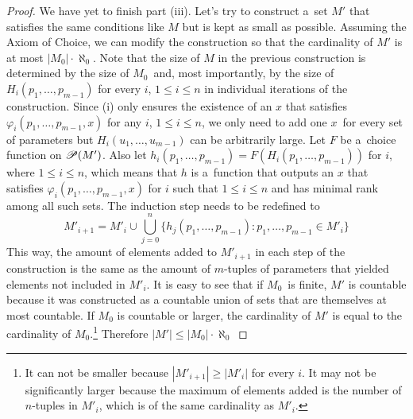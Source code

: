 \begin{proof}
We have yet to finish part (iii).
Let's try to construct a~set $M'$ that satisfies the same conditions like $M$ but is kept as small as possible. Assuming the Axiom of Choice, we can modify the construction so that the cardinality of $M'$ is at most $|M_0| \cdot \aleph_0$. Note that the size of $M$ in the previous construction is determined by the size of $M_0$ and, most importantly, by the size of $H_i(p_1, \ldots, p_{m-1})$ for every $i$, $1 \leq i \leq n$ in individual iterations of the construction. Since (i) only ensures the existence of an $x$ that satisfies $\varphi_i(p_1, \ldots, p_{m-1}, x)$ for any $i$, $1 \leq i \leq n$, we only need to add one $x$ for every set of parameters but $H_i(u_1, \dots, u_{m-1})$ can be arbitrarily large. Let $F$ be a~choice function on $\mathscr{P} (M')$. Also let $h_i(p_1, \ldots, p_{m-1}) = F(H_i(p_1, \ldots, p_{m-1}))$ for $i$, where $1 \leq i \leq n$, which means that $h$ is a~function that outputs an $x$ that satisfies $\varphi_i(p_1, \ldots, p_{m-1}, x)$ for $i$ such that $1 \leq i \leq n$ and has minimal rank among all such sets. The induction step needs to be redefined to
\begin{equation}
M'_{i+1} = M'_i \cup \bigcup_{j=0}^n \{ h_j(p_1, \ldots, p_{m-1}): p_1, \ldots, p_{m-1} \in M'_i \}
\end{equation}
This way, the amount of elements added to $M'_{i+1}$ in each step of the construction is the same as the amount of $m$-tuples of parameters that yielded elements not included in $M'_i$. It is easy to see that if $M_0$ is finite, $M'$ is countable because it was constructed as a countable union of sets that are themselves at most countable. If $M_0$ is countable or larger, the cardinality of $M'$ is equal to the cardinality of $M_0$.\footnote{It can not be smaller because $|M'_{i+1}| \geq |M'_i|$ for every $i$. It may not be significantly larger because the maximum of elements added is the number of $n$-tuples in $M'_i$, which is of the same cardinality as $M'_i$.}
Therefore $|M'| \leq |M_0| \cdot \aleph_0$
\end{proof}

